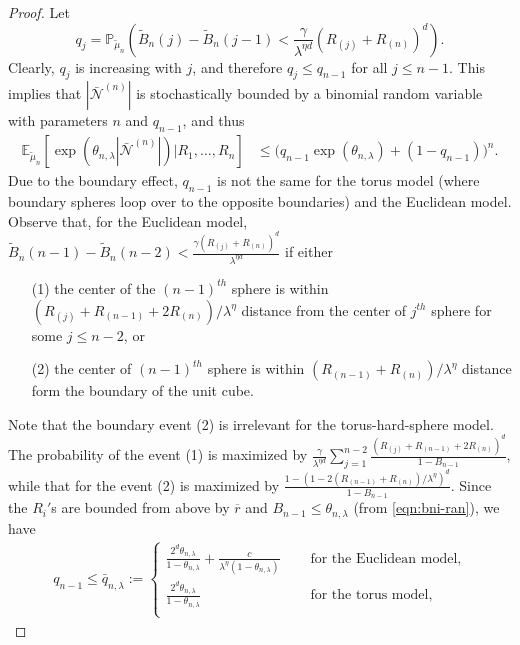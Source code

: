 \documentclass[11pt]{article}
\newcommand{\pp}{\mathbb{P}}
\newcommand{\ee}{\mathbb{E}}
\newcommand{\rbdd}{\overline{r}}
\newcommand{\lt}{\left}
\newcommand{\rt}{\right}
\newcommand{\wt}{\widetilde}
\begin{document}
\begin{appendices}
\begin{proof}
Let 
$$q_{j} = \pp_{\wt \mu_n}\left(\wt B_{n}(j) - \wt B_{n}(j-1) < \frac{\gamma }{\lambda^{\eta d}}(R_{(j)} + R_{(n)})^d\right).$$
Clearly, $q_{j}$ is increasing with $j$, and therefore $q_j \leq q_{n -1}$ for all $j \leq n-1$.
This implies that $|\bar{\mathscr N}^{(n)}|$ is stochastically bounded by a binomial random variable with parameters $n$ and $q_{n-1}$, and thus
\begin{align*}
\ee_{\wt \mu_n}\left[ \exp\left(\theta_{n, \lambda} |\bar{\mathscr N}^{(n)}| \right) \Big| R_1, \dots, R_n \right]  &\leq \Big( q_{n-1} \exp\lt(\theta_{n, \lambda}\rt) + (1 -  q_{n-1}) \Big)^n.
\end{align*}  
Due to the boundary effect, $q_{n-1}$ is not the same for the torus model (where boundary spheres loop over to the opposite boundaries) and the Euclidean model. 
Observe that, for the Euclidean model, $\wt B_{n}(n-1) - \wt B_{n}(n-2) < \frac{\gamma(R_{(j)} + R_{(n)})^d}{\lambda^{\eta d}}$ if either 
\begin{itemize}
\item[(1)] the center of the $(n -1)^{th}$ sphere is within $ (R_{(j)} + R_{(n-1)} + 2R_{(n)})/\lambda^\eta$ distance from the center of $j^{th}$ sphere for some $j \leq n-2$, or 
\item[(2)] the center of $(n-1)^{th}$ sphere is within $(R_{(n-1)} + R_{(n)})/\lambda^\eta$ distance form the boundary of the unit cube. 
\end{itemize}
Note that the boundary event (2) is irrelevant for the torus-hard-sphere model. 
The probability of the event (1) is maximized by $\displaystyle \frac{\gamma}{\lambda^{\eta d}} \sum_{j = 1}^{n-2}\frac{\lt(R_{(j)} + R_{(n-1)} + 2R_{(n)} \rt)^d}{1 - B_{n-1}}$, while that for the event (2) is maximized by $\displaystyle\frac{1 - \lt(1 - 2(R_{(n-1)} + R_{(n)})/\lambda^\eta \rt)^d}{1 - B_{n-1}}$.
{Since the} $R_{i}'$s are bounded from above by $\rbdd$ and $B_{n-1} \leq \theta_{n, \lambda}$ (from \eqref{eqn:bni-ran}), we have
\begin{align*}
 q_{n-1} \leq \bar q_{n,\lambda} := \begin{cases} 
             \frac{2^d \theta_{n,\lambda}}{1 - \theta_{n,\lambda}} + \frac{c}{\lambda^\eta (1 - \theta_{n,\lambda})}  &\quad \text{ for the Euclidean model},  \\
             \frac{2^d \theta_{n,\lambda}}{1 - \theta_{n,\lambda}}  &\quad \text{ for the torus model},  \\
\end{cases} 
\end{align*}

\end{proof}
\end{appendices}
\end{document}
